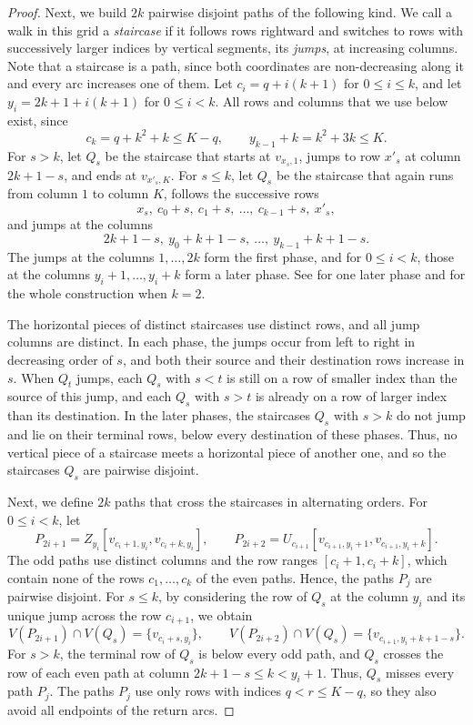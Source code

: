 \documentclass[fontsize=12pt,leading=14pt]{fullpaper}
\begin{document}
\begin{proof}
  Next, we build $2k$ pairwise disjoint paths of the following kind.
  We call a walk in this grid a \emph{staircase} if it follows rows rightward and switches to rows with successively larger indices by vertical segments, its \emph{jumps}, at increasing columns.
  Note that a staircase is a path, since both coordinates are non-decreasing along it and every arc increases one of them.
  Let $c_i=q+i(k+1)$ for $0\le i\le k$, and let $y_i=2k+1+i(k+1)$ for $0\le i<k$.
  All rows and columns that we use below exist, since
  \[
    c_k=q+k^2+k\le K-q,\qquad y_{k-1}+k=k^2+3k\le K.
  \]
  For $s>k$, let $Q_s$ be the staircase that starts at $v_{x_s,1}$, jumps to row $x'_s$ at column $2k+1-s$, and ends at $v_{x'_s,K}$.
  For $s\le k$, let $Q_s$ be the staircase that again runs from column $1$ to column $K$, follows the successive rows
  \[
    x_s,\ c_0+s,\ c_1+s,\ \dots,\ c_{k-1}+s,\ x'_s,
  \]
  and jumps at the columns
  \[
    2k+1-s,\ y_0+k+1-s,\ \dots,\ y_{k-1}+k+1-s.
  \]
  The jumps at the columns $1,\dots,2k$ form the first phase, and for $0\le i<k$, those at the columns $y_i+1,\dots,y_i+k$ form a later phase.
  See  for one later phase and  for the whole construction when $k=2$.

  The horizontal pieces of distinct staircases use distinct rows, and all jump columns are distinct.
  In each phase, the jumps occur from left to right in decreasing order of $s$, and both their source and their destination rows increase in $s$.
  When $Q_t$ jumps, each $Q_s$ with $s<t$ is still on a row of smaller index than the source of this jump, and each $Q_s$ with $s>t$ is already on a row of larger index than its destination.
  In the later phases, the staircases $Q_s$ with $s>k$ do not jump and lie on their terminal rows, below every destination of these phases.
  Thus, no vertical piece of a staircase meets a horizontal piece of another one, and so the staircases $Q_s$ are pairwise disjoint.

  Next, we define $2k$ paths that cross the staircases in alternating orders.
  For $0\le i<k$, let
  \[
    P_{2i+1}=Z_{y_i}[v_{c_i+1,y_i},v_{c_i+k,y_i}],\qquad
    P_{2i+2}=U_{c_{i+1}}[v_{c_{i+1},y_i+1},v_{c_{i+1},y_i+k}].
  \]
  The odd paths use distinct columns and the row ranges $[c_i+1,c_i+k]$, which contain none of the rows $c_1,\dots,c_k$ of the even paths.
  Hence, the paths $P_j$ are pairwise disjoint.
  For $s\le k$, by considering the row of $Q_s$ at the column $y_i$ and its unique jump across the row $c_{i+1}$, we obtain
  \[
    V(P_{2i+1})\cap V(Q_s)=\{v_{c_i+s,y_i}\},\qquad
    V(P_{2i+2})\cap V(Q_s)=\{v_{c_{i+1},y_i+k+1-s}\}.
  \]
  For $s>k$, the terminal row of $Q_s$ is below every odd path, and $Q_s$ crosses the row of each even path at column $2k+1-s\le k<y_i+1$.
  Thus, $Q_s$ misses every path $P_j$.
  The paths $P_j$ use only rows with indices $q<r\le K-q$, so they also avoid all endpoints of the return arcs.


\end{proof}
\end{document}
